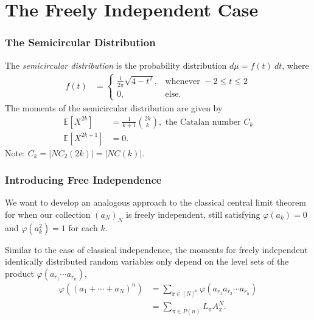 \documentclass{beamer}
\begin{document}
\section{The Freely Independent Case}%
\begin{frame}
  \frametitle{The Semicircular Distribution}
  The \textit{semicircular distribution} is the probability distribution $d\mu = f(t)\:dt$, where
  \begin{align*}
    f(t) &= \begin{cases}
      \frac{1}{2\pi}\sqrt{4-t^2}, & \text{whenever }-2 \leq t \leq 2\\
      0, & \text{else}.
    \end{cases}
  \end{align*}
  The moments of the semicircular distribution are given by
  \begin{align*}
    \mathbb{E}\left[ X^{2k} \right] &= \frac{1}{k+1} {2k\choose k},\text{ the Catalan number $C_k$}\\
    \mathbb{E}\left[ X^{2k + 1} \right] &= 0.
  \end{align*}
  Note: $C_k = \left\vert NC_2\left( 2k \right) \right\vert = \left\vert NC(k) \right\vert$.
\end{frame}
\begin{frame}
  \frametitle{Introducing Free Independence}
  We want to develop an analogous approach to the classical central limit theorem for when our collection $\left( a_N \right)_{N}$ is freely independent, still satisfying $\varphi\left( a_k \right) = 0$ and $\varphi\left( a_k^2 \right) = 1$ for each $k$.\newline\pause

  Similar to the case of classical independence, the moments for freely independent identically distributed random variables only depend on the level sets of the product $\varphi\left( a_{r_1}\cdots a_{r_n} \right)$,
  \begin{align*}
    \varphi\left( \left( a_1 + \cdots + a_N \right)^{n} \right) &= \sum_{ \mathbf{r}\in \left[ N \right]^{n} } \varphi\left( a_{r_1}a_{r_2}\cdots a_{r_n} \right)\\
                                                                &= \sum_{\pi\in P(n)} L_{\pi}A_{\pi}^{N}.
  \end{align*}
\end{frame}
\end{document}
